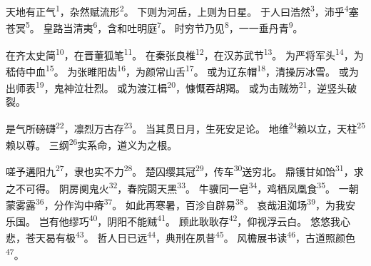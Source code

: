 
\begin{poem}
天地有正气\textsuperscript{1}，杂然赋流形\textsuperscript{2}。
下则为河岳，上则为日星。
于人曰浩然\textsuperscript{3}，沛乎\textsuperscript{4}塞苍冥\textsuperscript{5}。
皇路当清夷\textsuperscript{6}，含和吐明庭\textsuperscript{7}。
时穷节乃见\textsuperscript{8}，一一垂丹青\textsuperscript{9}。

在齐太史简\textsuperscript{10}，在晋董狐笔\textsuperscript{11}。
在秦张良椎\textsuperscript{12}，在汉苏武节\textsuperscript{13}。
为严将军头\textsuperscript{14}，为嵇侍中血\textsuperscript{15}。
为张睢阳齿\textsuperscript{16}，为颜常山舌\textsuperscript{17}。
或为辽东帽\textsuperscript{18}，清操厉冰雪。
或为出师表\textsuperscript{19}，鬼神泣壮烈。
或为渡江楫\textsuperscript{20}，慷慨吞胡羯。
或为击贼笏\textsuperscript{21}，逆竖头破裂。

是气所磅礴\textsuperscript{22}，凛烈万古存\textsuperscript{23}。
当其贯日月，生死安足论。
地维\textsuperscript{24}赖以立，天柱\textsuperscript{25}赖以尊。
三纲\textsuperscript{26}实系命，道义为之根。

嗟予遘阳九\textsuperscript{27}，隶也实不力\textsuperscript{28}。
楚囚缨其冠\textsuperscript{29}，传车\textsuperscript{30}送穷北。
鼎镬甘如饴\textsuperscript{31}，求之不可得。
阴房阒鬼火\textsuperscript{32}，春院閟天黑\textsuperscript{33}。
牛骥同一皂\textsuperscript{34}，鸡栖凤凰食\textsuperscript{35}。
一朝蒙雾露\textsuperscript{36}，分作沟中瘠\textsuperscript{37}。
如此再寒暑，百沴自辟易\textsuperscript{38}。
哀哉沮洳场\textsuperscript{39}，为我安乐国。
岂有他缪巧\textsuperscript{40}，阴阳不能贼\textsuperscript{41}。
顾此耿耿存\textsuperscript{42}，仰视浮云白。
悠悠我心悲，苍天曷有极\textsuperscript{43}。
哲人日已远\textsuperscript{44}，典刑在夙昔\textsuperscript{45}。
风檐展书读\textsuperscript{46}，古道照颜色\textsuperscript{47}。
\end{poem}

